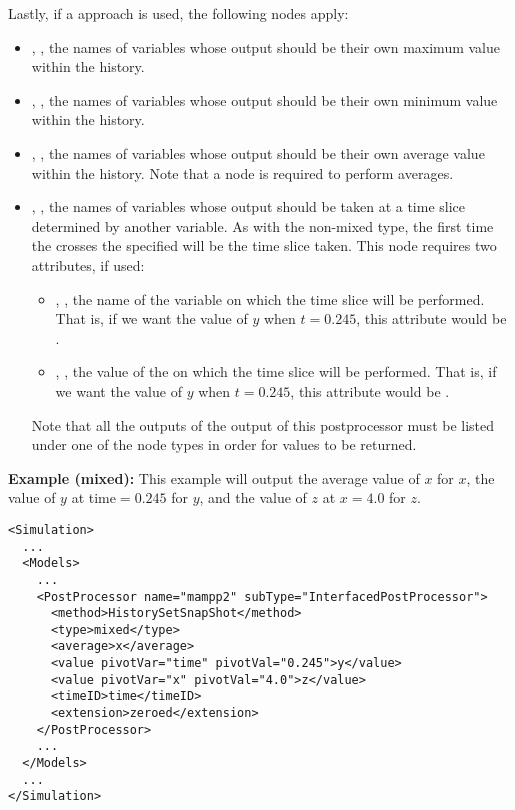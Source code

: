 Lastly, if a  approach is used, the following nodes apply:
\begin{itemize}
  \item {}, , the names of variables whose output should be their
    own maximum value within the history.
  \item {}, , the names of variables whose output should be their
    own minimum value within the history.
  \item {}, , the names of variables whose output should be their
    own average value within the history. Note that a  node is required to perform averages.
  \item {}, , the names of variables whose output should be taken
    at a time slice determined by another variable.  As with the non-mixed  type, the first
    time the  crosses the specified  will be the time slice taken.
    This node requires two attributes, if used:
    \begin{itemize}
      \item {}, , the name of the variable on which the time
        slice will be performed.  That is, if we want the value of $y$ when $t=0.245$,
        this attribute would be .
      \item {}, , the value of the  on which the time
        slice will be performed.  That is, if we want the value of $y$ when $t=0.245$,
        this attribute would be .
    \end{itemize}
  Note that all the outputs of the  output of this postprocessor must be listed under one
  of the  node types in order for values to be returned.
\end{itemize}

\textbf{Example (mixed):}
This example will output the average value of $x$ for $x$, the value of $y$ at
time$=0.245$ for $y$, and the value of $z$ at $x=4.0$ for $z$.
\begin{lstlisting}[style=XML,morekeywords={subType,debug,name,class,type}]
<Simulation>
  ...
  <Models>
    ...
    <PostProcessor name="mampp2" subType="InterfacedPostProcessor">
      <method>HistorySetSnapShot</method>
      <type>mixed</type>
      <average>x</average>
      <value pivotVar="time" pivotVal="0.245">y</value>
      <value pivotVar="x" pivotVal="4.0">z</value>
      <timeID>time</timeID>
      <extension>zeroed</extension>
    </PostProcessor>
    ...
  </Models>
  ...
</Simulation>
\end{lstlisting}



